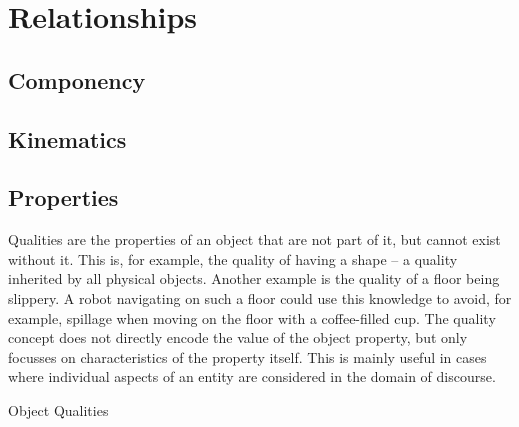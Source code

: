 \section{Relationships}
\label{sec:background:relations}
\subsection{Componency}

\subsection{Kinematics}

\subsection{Properties}
\label{sec:qualification}

Qualities are the properties of an object that are not part of it, but cannot exist without it.
This is, for example, the quality of having a shape -- a quality inherited by all physical objects.
Another example is the quality of a floor being slippery.
A robot navigating on such a floor could use this knowledge to avoid, for example,
spillage when moving on the floor with a coffee-filled cup.
The quality concept does not directly encode the value of the object property, but only focusses on characteristics of the property itself.
This is mainly useful in cases where individual aspects of an entity are considered in the domain of discourse.

\begin{ODP}{Object Qualities}
\end{ODP}

